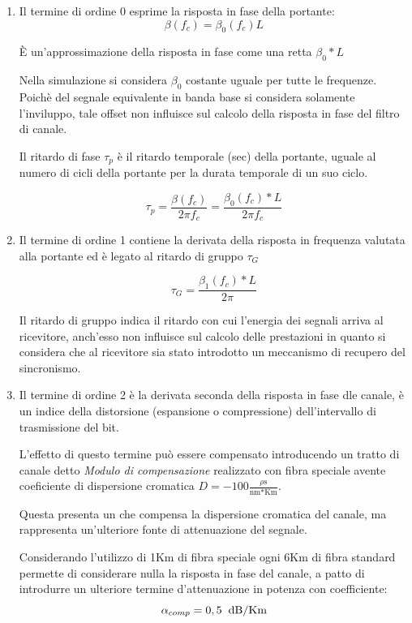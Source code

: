 \documentclass[12pt, a4paper]{article}
\begin{document}
\begin{enumerate}
	\item Il termine di ordine 0 esprime la risposta in fase della portante:
	\begin{equation}
		\beta(f_c) = \beta_0(f_c)L
	\end{equation}
	
	È un'approssimazione della risposta in fase come una retta $\beta_0*L$
	
	Nella simulazione si considera $\beta_0$ costante uguale per tutte le frequenze. Poichè del segnale equivalente in banda base si considera solamente l'inviluppo, tale offset non influisce sul calcolo della risposta in fase del filtro di canale.
	
	Il ritardo di fase $\tau_p$ è il ritardo temporale (sec) della portante, uguale al numero di cicli della portante per la durata temporale di un suo ciclo.
	
	
	\begin{equation}
		\tau_p = \frac{\beta(f_c)}{2\pi f_c} = \frac{\beta_0(f_c)
		*L}{2\pi f_c}
	\end{equation}

	\item Il termine di ordine 1 contiene la derivata della risposta in frequenza valutata alla portante ed è legato al ritardo di gruppo $\tau_G$
	
	\begin{equation}
		\tau_G = \frac{\beta_1(f_c)*L}{2\pi}
	\end{equation}

		Il ritardo di gruppo indica il ritardo con cui l'energia dei segnali arriva al ricevitore, anch'esso non influisce sul calcolo delle prestazioni in quanto si considera che al ricevitore sia stato introdotto un meccanismo di recupero del sincronismo. 

	\item Il termine di ordine 2 è la derivata seconda della risposta in fase dle canale, è un indice della distorsione (espansione o compressione) dell'intervallo di trasmissione del bit.
	
	L'effetto di questo termine può essere compensato introducendo un tratto di canale detto \textit{Modulo di compensazione} realizzato con fibra speciale avente coeficiente di dispersione cromatica $D = -100\frac{\rho\text{s}}{\text{nm*Km}}$.
	
	Questa presenta un  che compensa la dispersione cromatica del canale, ma rappresenta un'ulteriore fonte di attenuazione del segnale.
	
	Considerando l'utilizzo di 1Km di fibra speciale ogni 6Km di fibra standard permette di considerare nulla la risposta in fase del canale, a patto di introdurre un ulteriore termine d'attenuazione in potenza con coefficiente:
	\begin{equation}
		\alpha_{comp} = 0,5 \hspace{0.2cm} \text{dB/Km}
	\end{equation} 
		
\end{enumerate}
\end{document}
